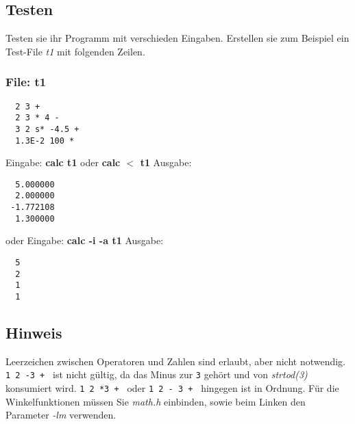 \subsection*{Testen}
Testen sie ihr Programm mit verschieden Eingaben. Erstellen sie zum Beispiel ein Test-File \emph{t1} mit folgenden Zeilen.

\subsubsection*{File: t1}
\begin{verbatim}
  2 3 +
  2 3 * 4 -
  3 2 s* -4.5 + 
  1.3E-2 100 *
\end{verbatim}
Eingabe: {\bf calc t1} oder {\bf calc $<$ t1}
Ausgabe: 
\begin{verbatim}
  5.000000
  2.000000
 -1.772108
  1.300000
\end{verbatim}
oder
Eingabe: {\bf calc -i -a t1}
Ausgabe: 
\begin{verbatim}
  5
  2
  1
  1
\end{verbatim}

\subsection*{Hinweis}
Leerzeichen zwischen Operatoren und Zahlen sind erlaubt, aber nicht notwendig. \verb|1 2 -3 + | ist nicht gültig, da das Minus zur \verb|3| gehört und von \emph{strtod(3)} konsumiert wird. \verb|1 2 *3 + | oder \verb|1 2 - 3 + | hingegen ist in Ordnung.
Für die Winkelfunktionen müssen Sie \emph{math.h} einbinden, sowie beim Linken den Parameter \emph{-lm} verwenden.

\osueguidelinesone


